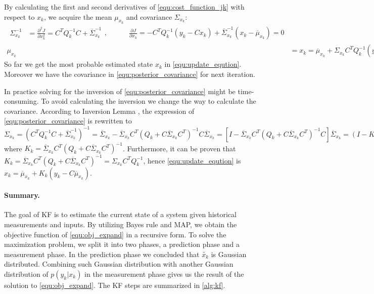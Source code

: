 By calculating the first and second derivatives of \cref{equ:cost_function_jk} with respect to $x_k$, we acquire the mean $\mu_{x_{k}}$ and covariance $\Sigma_{x_{k}}$:
\begin{subequations}
	\begin{align}
		\begin{split} \label{equ:posterior_covariance}
			\Sigma_{x_{k}}^{-1}&=\frac{\partial^2 J}{\partial x_k^2} =C^TQ_k^{-1}C + \overline{\Sigma}_{x_k}^{-1} 
		\end{split}, \hspace{3em}
		\frac{\partial J}{\partial x_k} = -C^TQ_k^{-1}(y_k-Cx_k)+\overline{\Sigma}_{x_k}^{-1}(x_k-\overline{\mu}_{x_k}) =0\\
		\mu_{x_{k}}&=x_k=\overline{\mu}_{x_k} + \Sigma_{x_k}C^TQ_k^{-1}(y_k-C\overline{\mu}_{x_k}) \label{equ:update_eqution}.
	\end{align}
\end{subequations}
So far we get the most probable estimated state $x_k$ in \cref{equ:update_eqution}. 
Moreover we have the covariance in \cref{equ:posterior_covariance} for next iteration. 

In practice solving for the inversion of \cref{equ:posterior_covariance} might be time-consuming. 
To avoid calculating the inversion we change the way to calculate the covariance. 
According to Inversion Lemma \cite{higham2002}, the expression of \cref{equ:posterior_covariance} is rewritten to
$
		\Sigma_{x_k} = (C^TQ_k^{-1}C + \overline{\Sigma}_{x_k}^{-1})^{-1}
		=\overline{\Sigma}_{x_k} - \overline{\Sigma}_{x_k} C^T (Q_k + C\overline{\Sigma}_{x_k}C^T)^{-1}C\overline{\Sigma}_{x_k}
		=[I-\overline{\Sigma}_{x_k} C^T (Q_k + C\overline{\Sigma}_{x_k}C^T)^{-1}C]\overline{\Sigma}_{x_k}
		=(I-K_kC)\overline{\Sigma}_{x_k},
$
where $K_k=\overline{\Sigma}_{x_k} C^T (Q_k + C\overline{\Sigma}_{x_k}C^T)^{-1}$.
Furthermore, it can be proven that $K_k=\overline{\Sigma}_{x_k} C^T (Q_k + C\overline{\Sigma}_{x_k}C^T)^{-1}=\Sigma_{x_k}C^TQ_k^{-1}$, hence \cref{equ:update_eqution} is 
$
	x_k =\overline{\mu}_{x_k} + K_k(y_k-C\overline{\mu}_{x_k}).
$


\paragraph{Summary.}
The goal of KF is to estimate the current state of a system given historical measurements and inputs. 
By utilizing  Bayes rule and MAP, we obtain the objective function of \cref{equ:obj_expand} in a recursive form.
To solve the maximization problem, we split it into two phases, a prediction phase and a measurement phase. 
In the prediction phase we concluded that $\tilde{x_k}$ is Gaussian distributed. Combining such Gaussian distribution with another Gaussian distribution of $p(y_k|x_k)$ in the measurement phase gives us the result of the solution to \cref{equ:obj_expand}.
The KF steps are summarized in \cref{alg:kf}.

